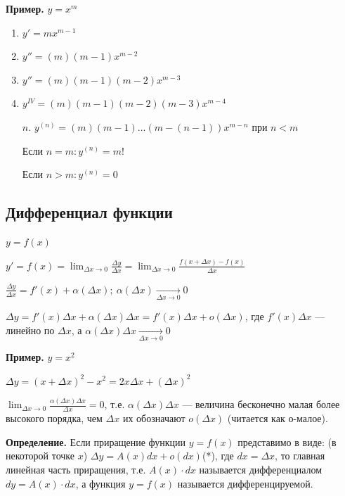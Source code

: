 \documentclass{article}
\begin{document}
    \textbf{Пример.} \( y = x^m \)

    \begin{enumerate}
        \item \( y' = mx^{m - 1} \)
        \item \( y'' = (m)(m - 1)x^{m - 2} \)
        \item \( y'' = (m)(m - 1)(m - 2)x^{m - 3} \)
        \item \( y^{IV} = (m)(m - 1)(m - 2)(m - 3)x^{m - 4} \)
        \item[\(n\).] \( y^{(n)} = (m)(m - 1)...(m - (n - 1))x^{m - n}\) при \(n < m\)
        
        Если \(n = m: y^{(n)} = m!\) 

        Если \(n > m: y^{(n)} = 0\)
    \end{enumerate}

    \subsection{Дифференциал функции}

    \( y = f(x) \)    

    \( y' = f(x) = \lim_{\Delta x \to 0}\frac{\Delta y}{\Delta x} = \lim_{\Delta x \to 0}\frac{f(x + \Delta x) - f(x)}{\Delta x} \)

    \( \frac{\Delta y}{\Delta x} = f'(x) + \alpha(\Delta x);\ \alpha(\Delta x) \xrightarrow[\Delta x \to 0]{} 0\)

    \( \Delta y = f'(x)\Delta x + \alpha(\Delta x)\Delta x = f'(x)\Delta x + o(\Delta x) \), где \(f'(x)\Delta x\) --- линейно по \(\Delta x\), а \(\alpha(\Delta x)\Delta x \xrightarrow[\Delta x \to 0]{} 0\)

    \textbf{Пример.} \( y = x^2 \)

    \( \Delta y = (x + \Delta x)^2 - x^2 = 2x\Delta x + (\Delta x)^2 \)

    \( \lim_{\Delta x \to 0}\frac{\alpha(\Delta x)\Delta x}{\Delta x} = 0 \), т.е. \(\alpha(\Delta x)\Delta x\) --- величина бесконечно малая более высокого порядка, чем \(\Delta x\) их обозначают \(o(\Delta x)\) (читается как о-малое).

    \textbf{Определение.} Если приращение функции \( y = f(x) \) представимо в виде: (в некоторой точке \(x\)) \( \Delta y = A(x)dx + o(dx) \)(*), где \( dx = \Delta x \), то главная линейная часть приращения, т.е. \(A(x)\cdot dx\) называется дифференциалом \(dy = A(x)\cdot dx\), а функция \( y = f(x) \) называется дифференцируемой.
\end{document}
